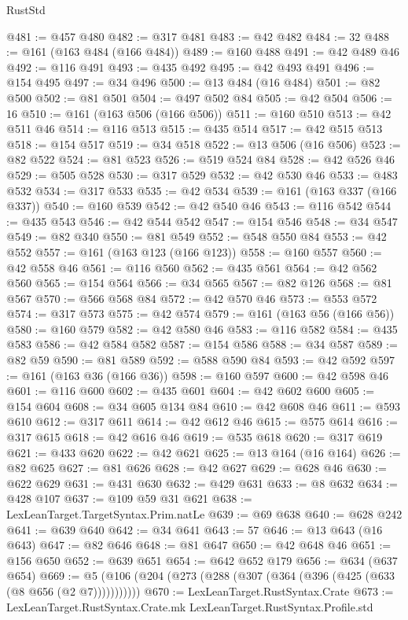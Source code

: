 \begin{lexlean}{RustStd}
\begin{coremodule}
@481 := @457 @480
@482 := @317 @481
@483 := @42 @482
@484 := 32
@488 := @161 (@163 @484 (@166 @484))
@489 := @160 @488
@491 := @42 @489 @46
@492 := @116 @491
@493 := @435 @492
@495 := @42 @493 @491
@496 := @154 @495
@497 := @34 @496
@500 := @13 @484 (@16 @484)
@501 := @82 @500
@502 := @81 @501
@504 := @497 @502 @84
@505 := @42 @504
@506 := 16
@510 := @161 (@163 @506 (@166 @506))
@511 := @160 @510
@513 := @42 @511 @46
@514 := @116 @513
@515 := @435 @514
@517 := @42 @515 @513
@518 := @154 @517
@519 := @34 @518
@522 := @13 @506 (@16 @506)
@523 := @82 @522
@524 := @81 @523
@526 := @519 @524 @84
@528 := @42 @526 @46
@529 := @505 @528
@530 := @317 @529
@532 := @42 @530 @46
@533 := @483 @532
@534 := @317 @533
@535 := @42 @534
@539 := @161 (@163 @337 (@166 @337))
@540 := @160 @539
@542 := @42 @540 @46
@543 := @116 @542
@544 := @435 @543
@546 := @42 @544 @542
@547 := @154 @546
@548 := @34 @547
@549 := @82 @340
@550 := @81 @549
@552 := @548 @550 @84
@553 := @42 @552
@557 := @161 (@163 @123 (@166 @123))
@558 := @160 @557
@560 := @42 @558 @46
@561 := @116 @560
@562 := @435 @561
@564 := @42 @562 @560
@565 := @154 @564
@566 := @34 @565
@567 := @82 @126
@568 := @81 @567
@570 := @566 @568 @84
@572 := @42 @570 @46
@573 := @553 @572
@574 := @317 @573
@575 := @42 @574
@579 := @161 (@163 @56 (@166 @56))
@580 := @160 @579
@582 := @42 @580 @46
@583 := @116 @582
@584 := @435 @583
@586 := @42 @584 @582
@587 := @154 @586
@588 := @34 @587
@589 := @82 @59
@590 := @81 @589
@592 := @588 @590 @84
@593 := @42 @592
@597 := @161 (@163 @36 (@166 @36))
@598 := @160 @597
@600 := @42 @598 @46
@601 := @116 @600
@602 := @435 @601
@604 := @42 @602 @600
@605 := @154 @604
@608 := @34 @605 @134 @84
@610 := @42 @608 @46
@611 := @593 @610
@612 := @317 @611
@614 := @42 @612 @46
@615 := @575 @614
@616 := @317 @615
@618 := @42 @616 @46
@619 := @535 @618
@620 := @317 @619
@621 := @433 @620
@622 := @42 @621
@625 := @13 @164 (@16 @164)
@626 := @82 @625
@627 := @81 @626
@628 := @42 @627
@629 := @628 @46
@630 := @622 @629
@631 := @431 @630
@632 := @429 @631
@633 := @8 @632
@634 := @428 @107
@637 := @109 @59 @31 @621
@638 := LexLeanTarget.TargetSyntax.Prim.natLe
@639 := @69 @638
@640 := @628 @242
@641 := @639 @640
@642 := @34 @641
@643 := 57
@646 := @13 @643 (@16 @643)
@647 := @82 @646
@648 := @81 @647
@650 := @42 @648 @46
@651 := @156 @650
@652 := @639 @651
@654 := @642 @652 @179
@656 := @634 (@637 @654)
@669 := @5 (@106 (@204 (@273 (@288 (@307 (@364 (@396 (@425 (@633 (@8 @656 (@2 @7)))))))))))
@670 := LexLeanTarget.RustSyntax.Crate
@673 := LexLeanTarget.RustSyntax.Crate.mk LexLeanTarget.RustSyntax.Profile.std

\end{coremodule}
\end{lexlean}
